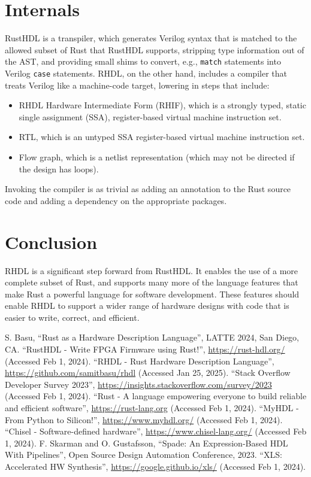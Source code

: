 \documentclass[sigplan,screen,sigconf]{acmart}
\begin{document}
\section{Internals}

RustHDL \cite{b13} is a transpiler, which generates Verilog syntax that is matched to the allowed subset of Rust that RustHDL supports, stripping type information out of the AST, and providing small shims to convert, e.g., \verb|match| statements into Verilog \verb|case| statements.  RHDL, on the other hand, includes a compiler that treats Verilog like a machine-code target, lowering in steps that include:
\begin{itemize}
\item RHDL Hardware Intermediate Form (RHIF), which is a strongly typed, static single assignment (SSA), register-based virtual machine instruction set.
\item RTL, which is an untyped SSA register-based virtual machine instruction set.
\item Flow graph, which is a netlist representation (which may not be directed if the design has loops).
\end{itemize}
Invoking the compiler is as trivial as adding an annotation to the Rust source code and adding a dependency on the appropriate packages.

\section{Conclusion}
RHDL is a significant step forward from RustHDL.  It enables the use of a more complete subset of Rust, and supports many more of the language features that make Rust a powerful language for software development.  These features should enable RHDL to support a wider range of hardware designs with code that is easier to write, correct, and efficient.

\newpage

\begin{thebibliography}{00}
   S. Basu, ``Rust as a Hardware Description Language'', LATTE 2024, San Diego, CA.
   ``RustHDL - Write FPGA Firmware using Rust!'', \url{https://rust-hdl.org/} (Accessed Feb 1, 2024).
   ``RHDL - Rust Hardware Description Language'', \url{https://github.com/samitbasu/rhdl} (Accessed Jan 25, 2025).
   ``Stack Overflow Developer Survey 2023'', \url{https://insights.stackoverflow.com/survey/2023} (Accessed Feb 1, 2024).
   ``Rust - A language empowering everyone to build reliable and efficient software'', \url{https://rust-lang.org} (Accessed Feb 1, 2024).
   ``MyHDL - From Python to Silicon!'', \url{https://www.myhdl.org/} (Accessed Feb 1, 2024).
   ``Chisel - Software-defined hardware'', \url{https://www.chisel-lang.org/} (Accessed Feb 1, 2024).
   F. Skarman and O. Gustafsson, ``Spade: An Expression-Based HDL With Pipelines'', Open Source Design Automation Conference, 2023.
   ``XLS: Accelerated HW Synthesis'', \url{https://google.github.io/xls/} (Accessed Feb 1, 2024).
\end{thebibliography}
\end{document}
